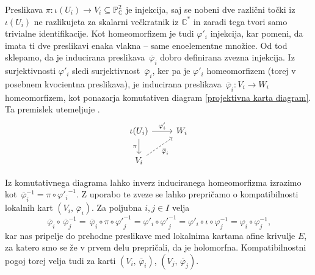 \documentclass[mat1]{fmfdelo}
\numberwithin{equation}{section}
\newcommand{\C}{\mathbb C}
\newcommand{\CM}{\mathbb C ^*}
\newcommand{\PC}{\mathbb{P}^2_\C}
\newcommand{\inv}{^{-1}}
\newcommand{\olsi}[1]{\,\overline{\!{#1}}} %
\theoremstyle{definition}
\begin{document}
Preslikava $\pi: \iota(U_i) \to V_i \subseteq \PC$ je injekcija, saj se nobeni dve različni točki iz $\iota(U_i)$ ne razlikujeta za skalarni večkratnik iz $\CM$ in zaradi tega tvori samo trivialne identifikacije. Kot homeomorfizem je tudi $\varphi'_i$ injekcija, kar pomeni, da imata ti dve preslikavi enaka vlakna -- same enoelementne množice. Od tod sklepamo, da je inducirana preslikava $\olsi{\varphi}_i$ dobro definirana zvezna injekcija. Iz surjektivnosti $\varphi'_i$ sledi surjektivnost $\olsi{\varphi}_i$, ker pa je $\varphi'_i$ homeomorfizem (torej v posebnem kvocientna preslikava), je inducirana preslikava $\olsi{\varphi}_i : V_i \to W_i$ homeomorfizem, kot ponazarja komutativen diagram \eqref{projektivna karta diagram}. Ta premislek utemeljuje \cite[posledica 3.23]{MrcunTop}.
%
%
\begin{equation}
    \label{projektivna karta diagram}    
    \begin{tikzcd}
	{\iota(U_i)} & {W_i} \\
	{V_i}
	\arrow["{\varphi'_i}", from=1-1, to=1-2]
	\arrow["\pi"', from=1-1, to=2-1]
	\arrow["{\olsi{\varphi}_i}"', dashed, from=2-1, to=1-2]
    \end{tikzcd}
\end{equation}


Iz komutativnega diagrama lahko inverz induciranega homeomorfizma izrazimo kot $\olsi{\varphi}_i\inv = \pi \circ {\varphi'_i}\inv$. Z uporabo te zveze se lahko prepričamo o kompatibilnosti lokalnih kart
$(V_i, \olsi{\varphi}_i)$.
Za poljubna $i,j \in I$ velja
\[
    \olsi{\varphi}_i \circ \olsi{\varphi}_j\inv = 
    \olsi{\varphi}_i \circ \pi \circ {\varphi'}_j\inv = 
    \varphi'_i \circ {\varphi'}_j\inv = 
    \varphi'_i \circ \iota \circ \varphi_j\inv = 
    \varphi_i \circ \varphi_j\inv,
\]
kar nas pripelje do prehodne preslikave med lokalnima kartama afine krivulje $E$, za katero smo se že v prvem delu prepričali, da je holomorfna. Kompatibilnostni pogoj torej velja tudi za karti $(V_i, \olsi{\varphi}_i)$, $(V_j, \olsi{\varphi}_j)$.
\end{document}
